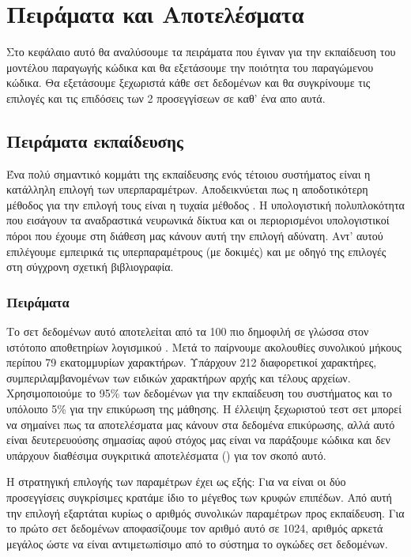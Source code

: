 \chapter{Πειράματα και Αποτελέσματα}

Στο κεφάλαιο αυτό θα αναλύσουμε τα πειράματα που έγιναν για την εκπαίδευση του μοντέλου παραγωγής κώδικα και θα εξετάσουμε την ποιότητα του παραγώμενου κώδικα.
Θα εξετάσουμε ξεχωριστά κάθε σετ δεδομένων και θα συγκρίνουμε τις επιλογές και τις επιδόσεις των 2 προσεγγίσεων σε καθ' ένα απο αυτά.

\section{Πειράματα εκπαίδευσης}

Ένα πολύ σημαντικό κομμάτι της εκπαίδευσης ενός τέτοιου συστήματος είναι η κατάλληλη επιλογή των υπερπαραμέτρων.
Αποδεικνύεται πως η αποδοτικότερη μέθοδος για την επιλογή τους είναι η τυχαία μέθοδος \cite{Bergstra2012}.
Η υπολογιστική πολυπλοκότητα που εισάγουν τα αναδραστικά νευρωνικά δίκτυα και οι περιορισμένοι υπολογιστικοί πόροι που έχουμε στη διάθεση μας κάνουν αυτή την επιλογή αδύνατη.
Αντ' αυτού επιλέγουμε εμπειρικά τις υπερπαραμέτρους (με δοκιμές) και με οδηγό της επιλογές στη σύγχρονη σχετική βιβλιογραφία.

\subsection{ Πειράματα}

Το σετ δεδομένων αυτό αποτελείται από τα 100 πιο δημοφιλή  σε γλώσσα  στον ιστότοπο αποθετηρίων λογισμικού .
Μετά το  παίρνουμε ακολουθίες συνολικού μήκους περίπου 79 εκατομμυρίων χαρακτήρων.
Υπάρχουν 212 διαφορετικοί χαρακτήρες, συμπεριλαμβανομένων των ειδικών χαρακτήρων αρχής και τέλους αρχείων.
Χρησιμοποιούμε το 95\% των δεδομένων για την εκπαίδευση του συστήματος και το υπόλοιπο 5\% για την επικύρωση της μάθησης.
Η έλλειψη ξεχωριστού τεστ σετ μπορεί να σημαίνει πως τα αποτελέσματα μας κάνουν  στα δεδομένα επικύρωσης, αλλά αυτό είναι δευτερευούσης σημασίας αφού στόχος μας είναι να παράξουμε κώδικα και δεν υπάρχουν διαθέσιμα συγκριτικά αποτελέσματα () για τον σκοπό αυτό.

Η στρατηγική επιλογής των παραμέτρων έχει ως εξής: Για να είναι οι δύο προσεγγίσεις συγκρίσιμες κρατάμε ίδιο το μέγεθος των κρυφών επιπέδων.
Από αυτή την επιλογή εξαρτάται κυρίως ο αριθμός συνολικών παραμέτρων προς εκπαίδευση.
Για το πρώτο σετ δεδομένων αποφασίζουμε τον αριθμό αυτό σε 1024, αριθμός αρκετά μεγάλος ώστε να είναι αντιμετωπίσιμο από το σύστημα το ογκώδες σετ δεδομένων.

